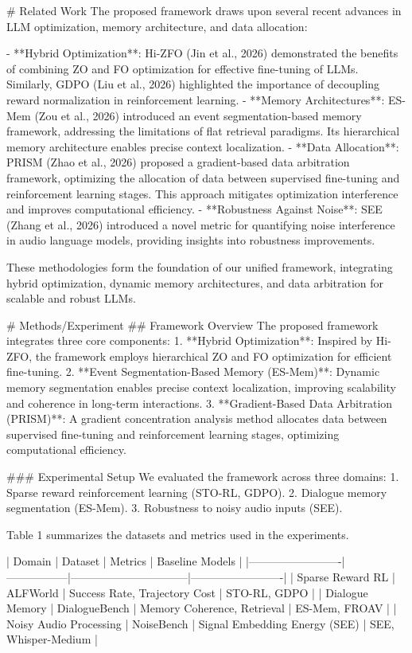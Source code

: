 # Related Work
The proposed framework draws upon several recent advances in LLM optimization, memory architecture, and data allocation:

- **Hybrid Optimization**: Hi-ZFO (Jin et al., 2026) demonstrated the benefits of combining ZO and FO optimization for effective fine-tuning of LLMs. Similarly, GDPO (Liu et al., 2026) highlighted the importance of decoupling reward normalization in reinforcement learning.
- **Memory Architectures**: ES-Mem (Zou et al., 2026) introduced an event segmentation-based memory framework, addressing the limitations of flat retrieval paradigms. Its hierarchical memory architecture enables precise context localization.
- **Data Allocation**: PRISM (Zhao et al., 2026) proposed a gradient-based data arbitration framework, optimizing the allocation of data between supervised fine-tuning and reinforcement learning stages. This approach mitigates optimization interference and improves computational efficiency.
- **Robustness Against Noise**: SEE (Zhang et al., 2026) introduced a novel metric for quantifying noise interference in audio language models, providing insights into robustness improvements.

These methodologies form the foundation of our unified framework, integrating hybrid optimization, dynamic memory architectures, and data arbitration for scalable and robust LLMs.

# Methods/Experiment
## Framework Overview
The proposed framework integrates three core components:
1. **Hybrid Optimization**: Inspired by Hi-ZFO, the framework employs hierarchical ZO and FO optimization for efficient fine-tuning.
2. **Event Segmentation-Based Memory (ES-Mem)**: Dynamic memory segmentation enables precise context localization, improving scalability and coherence in long-term interactions.
3. **Gradient-Based Data Arbitration (PRISM)**: A gradient concentration analysis method allocates data between supervised fine-tuning and reinforcement learning stages, optimizing computational efficiency.

### Experimental Setup
We evaluated the framework across three domains:
1. Sparse reward reinforcement learning (STO-RL, GDPO).
2. Dialogue memory segmentation (ES-Mem).
3. Robustness to noisy audio inputs (SEE).

Table 1 summarizes the datasets and metrics used in the experiments.

| Domain                  | Dataset         | Metrics                        | Baseline Models         |
|-------------------------|-----------------|--------------------------------|-------------------------|
| Sparse Reward RL        | ALFWorld        | Success Rate, Trajectory Cost | STO-RL, GDPO           |
| Dialogue Memory         | DialogueBench   | Memory Coherence, Retrieval    | ES-Mem, FROAV          |
| Noisy Audio Processing  | NoiseBench      | Signal Embedding Energy (SEE)  | SEE, Whisper-Medium     |

